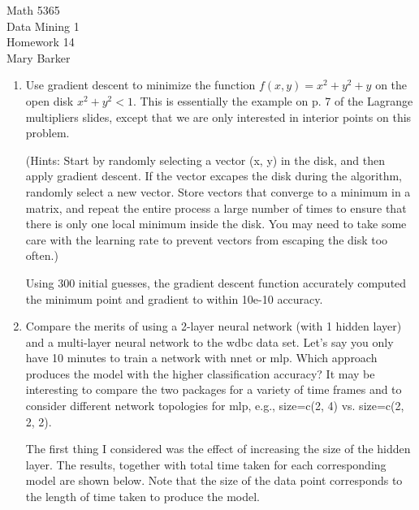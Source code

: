 \documentclass[11pt]{article}
\begin{document}
\noindent\large{Math 5365}\\
\large{Data Mining 1}\\
\large{Homework 14}\\
\large{Mary Barker}
\doublespace
\begin{enumerate}
\item 
 Use gradient descent to minimize the function $f(x, y) = x^2 + y^2 + y$
 on the open disk $x^2 + y^2 < 1$. This is essentially the example on 
 p. 7 of the Lagrange multipliers slides, except that we are only 
 interested in interior points on this problem. 

 (Hints: Start by randomly selecting a vector (x, y) in the disk, and 
  then apply gradient descent. If the vector excapes the disk during the 
  algorithm, randomly select a new vector. Store vectors that converge 
  to a minimum in a matrix, and repeat the entire process a large number 
  of times to ensure that there is only one local minimum inside the disk. 
  You may need to take some care with the learning rate to prevent vectors 
  from escaping the disk too often.)

Using 300 initial guesses, the gradient descent function accurately computed 
the minimum point and gradient to within 10e-10 accuracy. 

\item
 Compare the merits of using a 2-layer neural network (with 1 hidden layer) 
 and a multi-layer neural network to the wdbc data set. Let's say you only 
 have 10 minutes to train a network with nnet or mlp. Which approach produces 
 the model with the higher classification accuracy? It may be interesting to 
 compare the two packages for a variety of time frames and to consider 
 different network topologies for mlp, e.g., size=c(2, 4) vs. size=c(2, 2, 2).

The first thing I considered was the effect of increasing the size of the hidden layer. 
The results, together with total time taken for each corresponding model are shown below. 
Note that the size of the data point corresponds to the length of time taken to 
produce the model. 


\end{enumerate}
\end{document}
